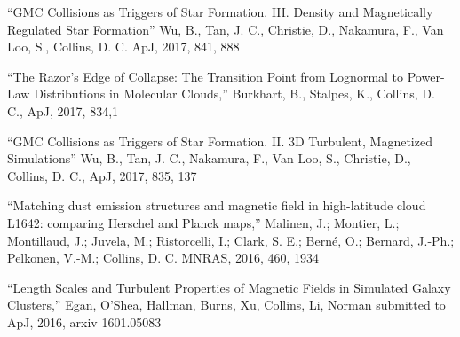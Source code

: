 \medskip
\noindent
``GMC Collisions as Triggers of Star Formation. III. Density and Magnetically Regulated Star Formation''
Wu, B., Tan, J. C., Christie, D., Nakamura, F., Van Loo, S., Collins, D. C. 
ApJ, 2017, 841, 888

\medskip
\noindent
``The Razor’s Edge of Collapse: The Transition Point from Lognormal to Power-Law Distributions in Molecular Clouds,'' 
Burkhart, B., Stalpes, K., Collins, D. C.,
ApJ, 2017, 834,1

\medskip
\noindent
``GMC Collisions as Triggers of Star Formation. II. 3D Turbulent, Magnetized Simulations'' 
Wu, B., Tan, J. C., Nakamura, F., Van Loo, S., Christie, D., Collins, D. C., 
ApJ, 2017, 835, 137

\medskip
\noindent
``Matching dust emission structures and magnetic field in high-latitude cloud L1642: comparing Herschel and Planck maps,''
Malinen, J.; Montier, L.; Montillaud, J.; Juvela, M.; Ristorcelli, I.; Clark, S.  E.; Bern\'e, O.; Bernard, J.-Ph.; Pelkonen, V.-M.; Collins, D. C. 
MNRAS, 2016, 460, 1934


\medskip
\noindent
``Length Scales and Turbulent Properties of Magnetic Fields in Simulated Galaxy Clusters,'' 
Egan, O’Shea, Hallman, Burns, Xu, Collins, Li, Norman  
submitted to ApJ, 2016, arxiv 1601.05083

